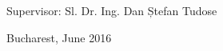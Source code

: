 \vfill\vfill\vfill
\begin{center}
	\Large
	Supervisor: Sl. Dr. Ing. Dan Ștefan Tudose\\
\end{center}

\vfill
\begin{center}
	\large
	Bucharest, June 2016
\end{center}

\cleardoublepage


\pagestyle{headings}
\tableofcontents

